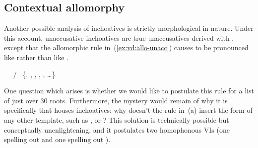 \begin{exe}
\begin{xlist}
\begin{xlist}
\begin{exe}
\begin{exe}
\begin{xlist}
\begin{exe}
\begin{xlist}
\begin{exe}
\begin{xlist}
\begin{xlist}
\begin{exe}
\begin{xlist}
\begin{exe}
\begin{xlist}
\begin{exe}
\begin{exe}
\begin{exe}
\begin{xlist}
\begin{exe}
\begin{exe}
\begin{xlist}
\begin{xlist}
\begin{exe}
\begin{xlist}
\begin{exe}
\begin{exe}
\begin{exe}
\begin{xlist}
\begin{exe}
\begin{exe}
\begin{xlist}
\begin{exe}
\begin{xlist}
\begin{exe}
\begin{xlist}
\begin{exe}
\begin{xlist}
\begin{exe}
\begin{exe}
\begin{xlist}
\begin{exe}
\begin{exe}
\begin{xlist}
\begin{xlist}
\begin{exe}
\begin{xlist}
\begin{xlist}
\begin{exe}
\begin{xlist}
\begin{exe}
\begin{xlist}
\begin{exe}
\begin{xlist}
\begin{exe}
\begin{xlist}
\begin{exe}
\begin{exe}
\begin{exe}
\begin{exe}
\begin{xlist}
\begin{exe}
\begin{exe}
\begin{xlist}
\begin{xlist}
\begin{exe}
\begin{exe}
\begin{xlist}
\begin{exe}
\begin{xlist}
\begin{exe}
\begin{xlist}
	\subsection{Contextual allomorphy}
Another possible analysis of inchoatives is strictly morphological in nature. Under this account, unaccusative inchoatives are true unaccusatives derived with {\vz}, except that the allomorphic rule in~(\ref{ex:vd:allo-unacc}) causes {\vz} to be pronounced like {\thif} rather than like {\tnif}.
 \begin{exe}
 \ex  
 \begin{xlist} 
   \ex  \vz~\lra~{\thif} / \trace~\{, , , , , \dots \}\label{ex:vd:allo-unacc} 
   \ex  \vz~\lra~{\tnif} 
 \z
\z 

One question which arises is whether we would like to postulate this rule for a list of just over 30 roots. Furthermore, the mystery would remain of why it is specifically {\thif} that houses inchoatives: why doesn't the rule in~(\lastx a) insert the form of any other template, such as {\tkal}, {\tnif} or {\tpie}? This solution is technically possible but conceptually unenlightening, and it postulates two homophonous VIs {\thif} (one spelling out {\vd} and one spelling out {\vz}).


\end{xlist}
\end{exe}
\end{xlist}
\end{exe}
\end{xlist}
\end{exe}
\end{xlist}
\end{exe}
\end{exe}
\end{xlist}
\end{xlist}
\end{exe}
\end{exe}
\end{xlist}
\end{exe}
\end{exe}
\end{exe}
\end{exe}
\end{xlist}
\end{exe}
\end{xlist}
\end{exe}
\end{xlist}
\end{exe}
\end{xlist}
\end{exe}
\end{xlist}
\end{xlist}
\end{exe}
\end{xlist}
\end{xlist}
\end{exe}
\end{exe}
\end{xlist}
\end{exe}
\end{exe}
\end{xlist}
\end{exe}
\end{xlist}
\end{exe}
\end{xlist}
\end{exe}
\end{xlist}
\end{exe}
\end{exe}
\end{xlist}
\end{exe}
\end{exe}
\end{exe}
\end{xlist}
\end{exe}
\end{xlist}
\end{xlist}
\end{exe}
\end{exe}
\end{xlist}
\end{exe}
\end{exe}
\end{exe}
\end{xlist}
\end{exe}
\end{xlist}
\end{exe}
\end{xlist}
\end{xlist}
\end{exe}
\end{xlist}
\end{exe}
\end{xlist}
\end{exe}
\end{exe}
\end{xlist}
\end{xlist}
\end{exe}

